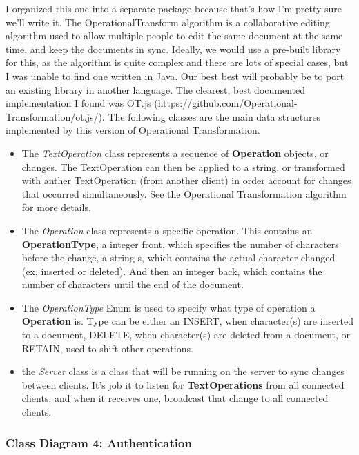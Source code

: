 \documentclass[twoside,letterpaper]{article}
\begin{document}
{I organized this one into a separate package because that's how I'm pretty sure we'll write it. The OperationalTransform algorithm is a collaborative editing algorithm used to allow multiple people to edit the same document at the same time, and keep the documents in sync. Ideally, we would use a pre-built library for this, as the algorithm is quite complex and there are lots of special cases, but I was unable to find one written in Java. Our best best will probably be to port an existing library in another language. The clearest, best documented implementation I found was OT.js (https://github.com/Operational-Transformation/ot.js/). The following classes are the main data structures implemented by this version of Operational Transformation.
\begin{itemize}
\item The \textit{TextOperation} class represents a sequence of \textbf{Operation} objects, or changes. The TextOperation can then be applied to a string, or transformed with anther TextOperation (from another client) in order account for changes that occurred simultaneously. See the Operational Transformation algorithm for more details.
\item The \textit{Operation} class represents a specific operation. This contains an \textbf{OperationType}, a integer front, which specifies the number of characters before the change, a string s, which contains the actual character changed (ex, inserted or deleted). And then an integer back, which contains the number of characters until the end of the document.
\item The \textit{OperationType} Enum is used to specify what type of operation a \textbf{Operation} is. Type can be either an INSERT, when character(s) are inserted to a document, DELETE, when character(s) are deleted from a document, or RETAIN, used to shift other operations.
\item the \textit{Server} class is a class that will be running on the server to sync changes between clients. It's job it to listen for \textbf{TextOperations} from all connected clients, and when it receives one, broadcast that change to all connected clients.
\end{itemize}
\newpage
\subsubsection[Class Diagram 4: Authentication]{\rmfamily\bfseries\color{black}
	Class Diagram 4: Authentication}
\hypertarget{RefHeading22059017292}{}
\bigskip

}
\end{document}
